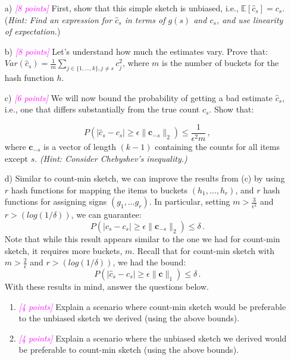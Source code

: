 \documentclass{exam}
\newcommand{\E}{\mathbb{E}}
\newcommand{\grade}[1]{\small\textcolor{magenta}{\emph{[#1 points]}} \normalsize}
\begin{document}
\begin{itemize}

\item[{a)}] \grade{8} First, show that this simple sketch is unbiased, i.e., $\E[\hat{c}_s] = c_s$. (\textit{Hint: Find an expression for $\hat{c}_s$ in terms of $g(s)$ and $c_s$, and use linearity of expectation.})  \\

\newpage
\item[{b)}] \grade{8} Let's understand how much the estimates vary. Prove that: $Var(\hat{c}_s) = \frac{1}{m}\sum_{j \in \{1, \dots, k\}, j \neq s} c_j^2$, where $m$ is the number of buckets for the hash function $h$.



\newpage
\item[{c)}] \grade{6} We will now bound the probability of getting a bad
  estimate $\hat{c}_s$, i.e., one that differs substantially from the true count $c_s$. Show that:

\[
P(|\hat{c}_s - c_s| \ge \epsilon \|\mathbf{c}_{-s}\|_2) \le \frac{1}{\epsilon^2 m}\, ,
\]
where $\mathbf{c}_{-s}$ is a vector of length $(k - 1)$ containing the counts for all items except $s$. \textit{(Hint: Consider Chebyshev's inequality.)} \\


\newpage
\item[{d)}] Similar to count-min sketch, we can improve the results from (c) by using $r$ hash functions for mapping the items to buckets $(h_1, \dots, h_r)$, and $r$ hash functions for assigning signs $(g_1, \dots g_r)$. In particular, setting $m > \frac{3}{\epsilon^2}$ and $r > (log(1/\delta))$, we can guarantee: 
$$
P(|\hat{c}_s - c_s| \ge \epsilon \|\mathbf{c}_{-s}\|_2) \le \delta\, .
$$
Note that while this result appears similar to the one we had for count-min sketch, it requires more buckets, $m$. Recall that for count-min sketch with $m > \frac{2}{\epsilon}$ and $r > (log(1/\delta))$, we had the bound:
$$
P(|\hat{c}_s - c_s| \ge \epsilon \|\mathbf{c}\|_1) \le \delta \, .
$$
With these results in mind, answer the questions below. 
\begin{enumerate}[label=\roman*.]
\item \grade{4} Explain a scenario where count-min sketch would be preferable to the unbiased sketch we derived (using the above bounds). \\

\vspace{8em}

\item \grade{4} Explain a scenario where the unbiased sketch we derived would be preferable to count-min sketch (using the above bounds). \\


\end{enumerate}

\end{itemize}
\end{document}
